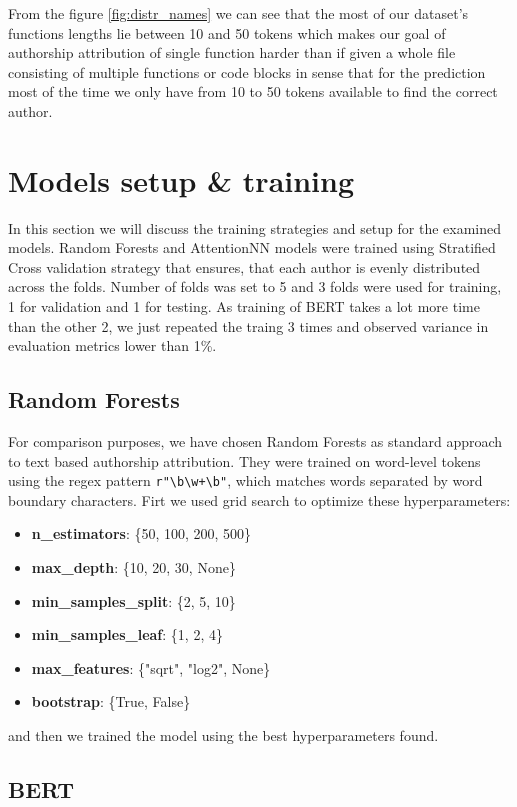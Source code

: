 \documentclass{article}
\begin{document}
From the figure \ref{fig:distr_names} we can see that the most of our dataset's 
functions lengths lie between 10 and 50 tokens which makes our goal of authorship attribution of single function
harder than if given a whole file consisting of multiple functions or code blocks in sense that for the prediction
most of the time we only have from 10 to 50 tokens available to find the correct author.

\section{Models setup \& training}

In this section we will discuss the training strategies and setup for the examined models.
Random Forests and AttentionNN models were trained using Stratified Cross validation strategy that ensures, that each author is evenly distributed
across the folds. Number of folds was set to 5 and 3 folds were used for training, 1 for validation and 1 for testing.
As training of BERT takes a lot more time than the other 2, we just repeated the traing 3 times and 
observed variance in evaluation metrics lower than 1\%.

\subsection{Random Forests}

For comparison purposes, we have chosen Random Forests as standard approach to text based authorship attribution. 
They were trained on word-level tokens using the regex pattern \verb|r"\b\w+\b"|, which matches words separated by word boundary characters.
Firt we used grid search to optimize these hyperparameters:
\begin{itemize}
    \item \textbf{n\_estimators}: \{50, 100, 200, 500\}
    \item \textbf{max\_depth}: \{10, 20, 30, None\}
    \item \textbf{min\_samples\_split}: \{2, 5, 10\}
    \item \textbf{min\_samples\_leaf}: \{1, 2, 4\}
    \item \textbf{max\_features}: \{"sqrt", "log2", None\}
    \item \textbf{bootstrap}: \{True, False\}
\end{itemize}

and then we trained the model using the best hyperparameters found.

\subsection{BERT}
\end{document}
